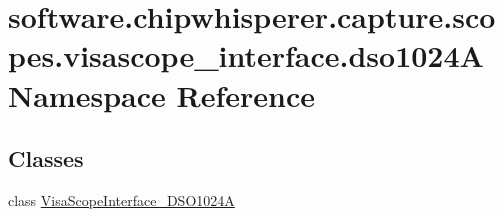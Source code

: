 \hypertarget{namespacesoftware_1_1chipwhisperer_1_1capture_1_1scopes_1_1visascope__interface_1_1dso1024A}{}\section{software.\+chipwhisperer.\+capture.\+scopes.\+visascope\+\_\+interface.\+dso1024\+A Namespace Reference}
\label{namespacesoftware_1_1chipwhisperer_1_1capture_1_1scopes_1_1visascope__interface_1_1dso1024A}
\subsection*{Classes}
\begin{DoxyCompactItemize}
\item 
class \hyperlink{classsoftware_1_1chipwhisperer_1_1capture_1_1scopes_1_1visascope__interface_1_1dso1024A_1_1VisaScopeInterface__DSO1024A}{Visa\+Scope\+Interface\+\_\+\+D\+S\+O1024\+A}
\end{DoxyCompactItemize}
